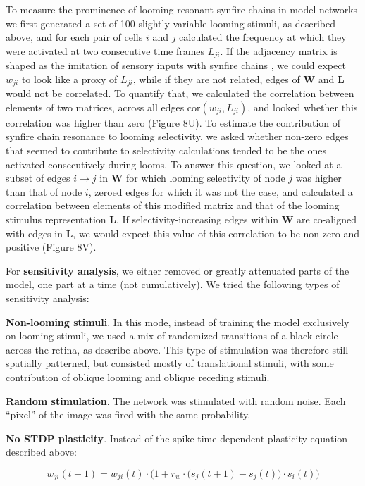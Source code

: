 \documentclass{article}
\begin{document}
To measure the prominence of looming-resonant synfire chains in model networks we first generated a set of 100 slightly variable looming stimuli, as described above, and for each pair of cells $i$ and $j$ calculated the frequency at which they were activated at two consecutive time frames $L_{ji}$. If the adjacency matrix is shaped as the imitation of sensory inputs with synfire chains \citep{clopath2010stdpcoding}, we could expect $w_{ji}$ to look like a proxy of $L_{ji}$, while if they are not related, edges of $\mathbf{W}$ and $\mathbf{L}$ would not be correlated. To quantify that, we calculated the correlation between elements of two matrices, across all edges $\text{cor}(w_{ji},L_{ji})$, and looked whether this correlation was higher than zero (Figure 8U). To estimate the contribution of synfire chain resonance to looming selectivity, we asked whether non-zero edges that seemed to contribute to selectivity calculations tended to be the ones activated consecutively during looms. To answer this question, we looked at a subset of edges $i \rightarrow j$ in $\mathbf{W}$ for which looming selectivity of node $j$ was higher than that of node $i$, zeroed edges for which it was not the case, and calculated a correlation between elements of this modified matrix and that of the looming stimulus representation $\mathbf{L}$. If selectivity-increasing edges within $\mathbf{W}$ are co-aligned with edges in $\mathbf{L}$, we would expect this value of this correlation to be non-zero and positive (Figure 8V).

For \textbf{sensitivity analysis}, we either removed or greatly attenuated parts of the model, one part at a time (not cumulatively). We tried the following types of sensitivity analysis:

\textbf{Non-looming stimuli}. In this mode, instead of training the model exclusively on looming stimuli, we used a mix of randomized transitions of a black circle across the retina, as describe above. This type of stimulation was therefore still spatially patterned, but consisted mostly of translational stimuli, with some contribution of oblique looming and oblique receding stimuli.

\textbf{Random stimulation}. The network was stimulated with random noise. Each “pixel” of the image was fired with the same probability.

\textbf{No STDP plasticity}. Instead of the spike-time-dependent plasticity equation described above:

\[ w_{ji}(t+1) = w_{ji}(t)\cdot\Big(1+r_w \cdot \big(s_j(t+1)-s_j(t)\big)\cdot s_i(t)\Big) \]
\end{document}

